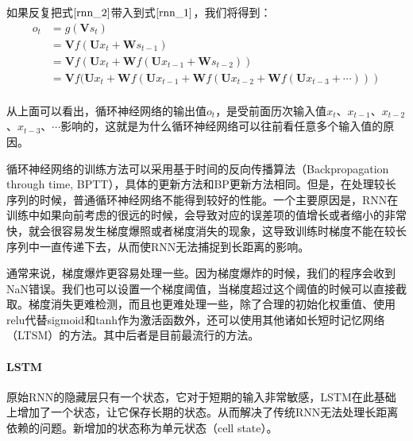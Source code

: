 如果反复把式$\eqref{rnn_2}$带入到式$\eqref{rnn_1}$，我们将得到：
\begin{equation}
\begin{aligned}
o_{t}&=g(\mathbf{V}s_{t})\\
&=\mathbf{V}f(\mathbf{U} x_{t}+\mathbf{W} s_{t-1})\\
&=\mathbf{V}f(\mathbf{U} x_{t}+\mathbf{W} f(\mathbf{U} x_{t-1}+\mathbf{W} s_{t-2}))\\
&=\mathbf{V}f(\mathbf{U} x_{t}+\mathbf{W} f(\mathbf{U} x_{t-1}+\mathbf{W} f(\mathbf{U} x_{t-2}+\mathbf{W} f(\mathbf{U} x_{t-3}+\cdots)))\\
\end{aligned}
\end{equation}

从上面可以看出，循环神经网络的输出值$o_{t}$，是受前面历次输入值$x_{t}$、$x_{t-1}$、$x_{t-2}$、$x_{t-3}$、$\cdots$影响的，这就是为什么循环神经网络可以往前看任意多个输入值的原因。

循环神经网络的训练方法可以采用基于时间的反向传播算法（Backpropagation through time, BPTT），具体的更新方法和BP更新方法相同。但是，在处理较长序列的时候，普通循环神经网络不能得到较好的性能。一个主要原因是，RNN在训练中如果向前考虑的很远的时候，会导致对应的误差项的值增长或者缩小的非常快，就会很容易发生梯度爆照或者梯度消失的现象，这导致训练时梯度不能在较长序列中一直传递下去，从而使RNN无法捕捉到长距离的影响。

通常来说，梯度爆炸更容易处理一些。因为梯度爆炸的时候，我们的程序会收到NaN错误。我们也可以设置一个梯度阈值，当梯度超过这个阈值的时候可以直接截取。梯度消失更难检测，而且也更难处理一些，除了合理的初始化权重值、使用relu代替sigmoid和tanh作为激活函数外，还可以使用其他诸如长短时记忆网络（LTSM）的方法。其中后者是目前最流行的方法。

 \paragraph{LSTM}
原始RNN的隐藏层只有一个状态，它对于短期的输入非常敏感，LSTM在此基础上增加了一个状态，让它保存长期的状态。从而解决了传统RNN无法处理长距离依赖的问题。新增加的状态称为单元状态（cell state）。

